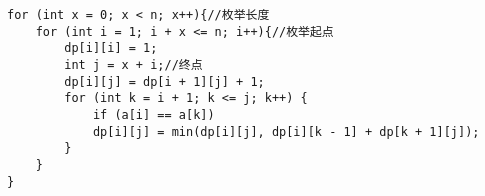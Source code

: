 \begin{lstlisting}
for (int x = 0; x < n; x++){//枚举长度
	for (int i = 1; i + x <= n; i++){//枚举起点
		dp[i][i] = 1;
		int j = x + i;//终点
		dp[i][j] = dp[i + 1][j] + 1;
		for (int k = i + 1; k <= j; k++) {
			if (a[i] == a[k])
			dp[i][j] = min(dp[i][j], dp[i][k - 1] + dp[k + 1][j]);
		}
	}
}
\end{lstlisting}